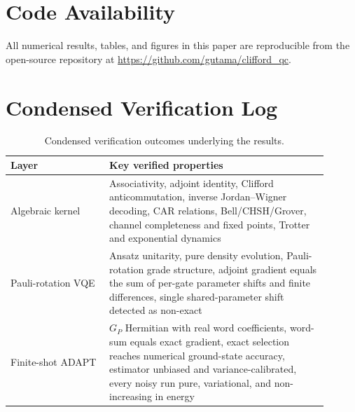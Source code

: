 \documentclass[11pt]{article}
\begin{document}
\section*{Code Availability}

All numerical results, tables, and figures in this paper are reproducible from the open-source repository at
\url{https://github.com/gutama/clifford_qc}.

\appendix

\section{Condensed Verification Log}

\begin{table}[h]
\centering
\caption{Condensed verification outcomes underlying the results.}
\begin{tabular}{p{0.28\linewidth}p{0.62\linewidth}}
\toprule
Layer & Key verified properties \\
\midrule
Algebraic kernel & Associativity, adjoint identity, Clifford anticommutation, inverse Jordan--Wigner decoding, CAR relations, Bell/CHSH/Grover, channel completeness and fixed points, Trotter and exponential dynamics \\
Pauli-rotation VQE & Ansatz unitarity, pure density evolution, Pauli-rotation grade structure, adjoint gradient equals the sum of per-gate parameter shifts and finite differences, single shared-parameter shift detected as non-exact \\
Finite-shot ADAPT & $G_P$ Hermitian with real word coefficients, word-sum equals exact gradient, exact selection reaches numerical ground-state accuracy, estimator unbiased and variance-calibrated, every noisy run pure, variational, and non-increasing in energy \\
\bottomrule
\end{tabular}
\end{table}
\end{document}
